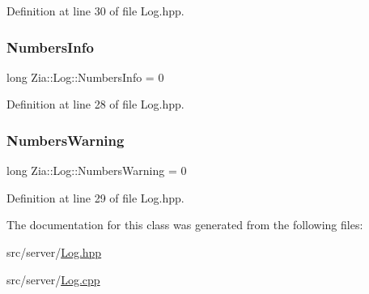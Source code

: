 Definition at line 30 of file Log.\+hpp.

\mbox{\label{class_zia_1_1_log_a3080034dce1aca8c3cc7b85775d30a1b}} 
\subsubsection{\texorpdfstring{Numbers\+Info}{NumbersInfo}}
{\footnotesize\ttfamily long Zia\+::\+Log\+::\+Numbers\+Info = 0\hspace{0.3cm}{\ttfamily [static]}}



Definition at line 28 of file Log.\+hpp.

\mbox{\label{class_zia_1_1_log_a64ce5169f6328628c8074a7664f8445c}} 
\subsubsection{\texorpdfstring{Numbers\+Warning}{NumbersWarning}}
{\footnotesize\ttfamily long Zia\+::\+Log\+::\+Numbers\+Warning = 0\hspace{0.3cm}{\ttfamily [static]}}



Definition at line 29 of file Log.\+hpp.



The documentation for this class was generated from the following files\+:\begin{DoxyCompactItemize}
\item 
src/server/\hyperlink{_log_8hpp}{Log.\+hpp}\item 
src/server/\hyperlink{_log_8cpp}{Log.\+cpp}\end{DoxyCompactItemize}
